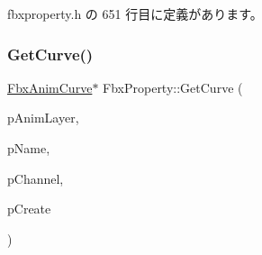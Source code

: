  fbxproperty.\+h の 651 行目に定義があります。

\mbox{\label{class_fbx_property_aa676a46d3dd168f9bdcac1b4161561ee}} 
\subsubsection{\texorpdfstring{Get\+Curve()}{GetCurve()}\hspace{0.1cm}{\footnotesize\ttfamily [3/3]}}
{\footnotesize\ttfamily \hyperlink{class_fbx_anim_curve}{Fbx\+Anim\+Curve}$\ast$ Fbx\+Property\+::\+Get\+Curve (\begin{DoxyParamCaption}\item[{\hyperlink{class_fbx_anim_layer}{Fbx\+Anim\+Layer} $\ast$}]{p\+Anim\+Layer,  }\item[{const char $\ast$}]{p\+Name,  }\item[{const char $\ast$}]{p\+Channel,  }\item[{bool}]{p\+Create }\end{DoxyParamCaption})}


